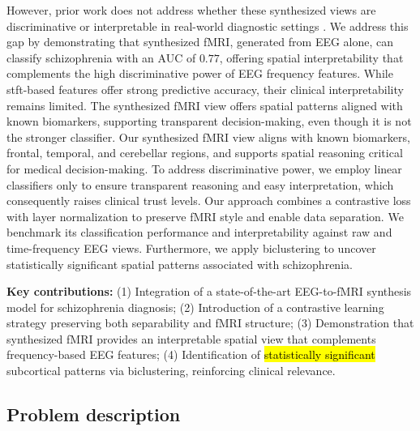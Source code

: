 \documentclass{article}
\begin{document}
However, prior work does not address whether these synthesized views are discriminative or interpretable in real-world diagnostic settings \cite{liu2019convolutional, liu2020latent, bricman2021eeg2fmri, calhas2022eeg, mehta2025time, li2024neurobolt, roos2025brainwaves}. We address this gap by demonstrating that synthesized fMRI, generated from EEG alone, can classify schizophrenia with an AUC of $0.77$, offering spatial interpretability that complements the high discriminative power of EEG frequency features. While stft-based features offer strong predictive accuracy, their clinical interpretability remains limited. The synthesized fMRI view offers spatial patterns aligned with known biomarkers, supporting transparent decision-making, even though it is not the stronger classifier. Our synthesized fMRI view aligns with known biomarkers, frontal, temporal, and cerebellar regions, and supports spatial reasoning critical for medical decision-making. To address discriminative power, we employ linear classifiers only to ensure transparent reasoning and easy interpretation, which consequently raises clinical trust levels. Our approach combines a contrastive loss with layer normalization to preserve fMRI style and enable data separation. We benchmark its classification performance and interpretability against raw and time-frequency EEG views. Furthermore, we apply biclustering \cite{govaert2008block} to uncover statistically significant spatial patterns associated with schizophrenia.

\textbf{Key contributions:} (1) Integration of a state-of-the-art EEG-to-fMRI synthesis model for schizophrenia diagnosis; (2) Introduction of a contrastive learning strategy preserving both separability and fMRI structure; (3) Demonstration that synthesized fMRI provides an interpretable spatial view that complements frequency-based EEG features; (4) Identification of \hl{statistically significant} subcortical patterns via biclustering, reinforcing clinical relevance.

\subsection*{Problem description}\label{section:problem_description}  
\end{document}
